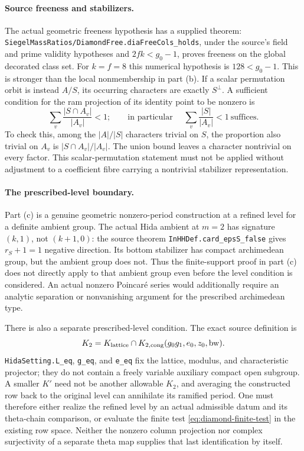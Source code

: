 \paragraph{Source freeness and stabilizers.}
The actual geometric freeness hypothesis has a supplied theorem:
\texttt{SiegelMassRatios/DiamondFree.diaFreeCols\_holds}, under
the source's field and prime validity hypotheses and
$2fk<g_0-1$, proves freeness on the global decorated class set.
For $k=f=8$ this numerical hypothesis is $128<g_0-1$.
This is stronger than the local nonmembership in part (b).
If a scalar permutation orbit is instead $A/S$, its occurring
characters are exactly $S^\perp$.  A sufficient condition for the
ram projection of its identity point to be nonzero is
\[
 \sum_v\frac{|S\cap A_v|}{|A_v|}<1;
 \qquad\text{in particular }\quad
 \sum_v\frac{|S|}{|A_v|}<1\ \text{suffices}.
\]
To check this, among the $|A|/|S|$ characters trivial on $S$, the
proportion also trivial on $A_v$ is
$|S\cap A_v|/|A_v|$.  The union bound leaves a character nontrivial
on every factor.  This scalar-permutation statement must not be
applied without adjustment to a coefficient fibre carrying a
nontrivial stabilizer representation.

\paragraph{The prescribed-level boundary.}
Part (c) is a genuine geometric nonzero-period construction at a
refined level for a definite ambient group.  The actual Hida ambient
at $m=2$ has signature $(k,1)$, not $(k+1,0)$: the source theorem
\texttt{InHHDef.card\_epsS\_false} gives $r_S+1=1$ negative
direction.  Its bottom stabilizer has compact archimedean group,
but the ambient group does not.  Thus the finite-support proof in
part (c) does not directly apply to that ambient group even before
the level condition is considered.  An actual nonzero Poincar\'e
series would additionally require an analytic separation or
nonvanishing argument for the prescribed archimedean type.

There is also a separate prescribed-level condition.  The exact
source definition is
\[
 K_2=K_{\rm lattice}\cap
 K_{2,\mathrm{cong}}(g_0g_1,e_0,z_0,\mathrm{bw}).
\]
\texttt{HidaSetting.L\_eq}, \texttt{g\_eq}, and
\texttt{e\_eq} fix the lattice, modulus, and characteristic
projector; they do not contain a freely variable auxiliary compact
open subgroup.  A smaller $K'$ need not be another allowable $K_2$,
and averaging the constructed row back to the original level can
annihilate its ramified period.  One must therefore either realize
the refined level by an actual admissible datum and its theta-chain
comparison, or evaluate the finite test
\eqref{eq:diamond-finite-test} in the existing row space.  Neither
the nonzero column projection nor complex surjectivity of a separate
theta map supplies that last identification by itself.

